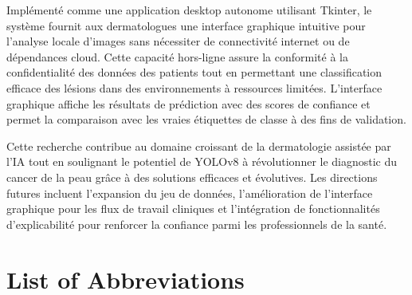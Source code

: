 \documentclass[a4paper,12pt]{report}
\begin{document}
\begin{spacing}{1.5}
    Implémenté comme une application desktop autonome utilisant Tkinter, le système fournit aux dermatologues une interface graphique intuitive pour l'analyse locale d'images sans nécessiter de connectivité internet ou de dépendances cloud. Cette capacité hors-ligne assure la conformité à la confidentialité des données des patients tout en permettant une classification efficace des lésions dans des environnements à ressources limitées. L'interface graphique affiche les résultats de prédiction avec des scores de confiance et permet la comparaison avec les vraies étiquettes de classe à des fins de validation.
    
    Cette recherche contribue au domaine croissant de la dermatologie assistée par l'IA tout en soulignant le potentiel de YOLOv8 à révolutionner le diagnostic du cancer de la peau grâce à des solutions efficaces et évolutives. Les directions futures incluent l'expansion du jeu de données, l'amélioration de l'interface graphique pour les flux de travail cliniques et l'intégration de fonctionnalités d'explicabilité pour renforcer la confiance parmi les professionnels de la santé.


\tableofcontents
\listoffigures
\listoftables
\lstlistoflistings
{}

\chapter*{List of Abbreviations}


\end{spacing}
\end{document}

